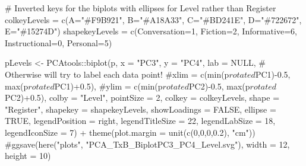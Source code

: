 \documentclass[
  letterpaper,
  DIV=11,
  numbers=noendperiod]{scrreprt}
\newenvironment{Shaded}{\begin{snugshade}}{\end{snugshade}}
\newcommand{\AttributeTok}[1]{\textcolor[rgb]{0.40,0.45,0.13}{#1}}
\newcommand{\CommentTok}[1]{\textcolor[rgb]{0.37,0.37,0.37}{#1}}
\newcommand{\ConstantTok}[1]{\textcolor[rgb]{0.56,0.35,0.01}{#1}}
\newcommand{\DecValTok}[1]{\textcolor[rgb]{0.68,0.00,0.00}{#1}}
\newcommand{\FloatTok}[1]{\textcolor[rgb]{0.68,0.00,0.00}{#1}}
\newcommand{\FunctionTok}[1]{\textcolor[rgb]{0.28,0.35,0.67}{#1}}
\newcommand{\NormalTok}[1]{\textcolor[rgb]{0.00,0.23,0.31}{#1}}
\newcommand{\OtherTok}[1]{\textcolor[rgb]{0.00,0.23,0.31}{#1}}
\newcommand{\SpecialCharTok}[1]{\textcolor[rgb]{0.37,0.37,0.37}{#1}}
\newcommand{\StringTok}[1]{\textcolor[rgb]{0.13,0.47,0.30}{#1}}
\begin{document}
\begin{Shaded}
\begin{Highlighting}[]
\CommentTok{\# Inverted keys for the biplots with ellipses for Level rather than Register}
\NormalTok{colkeyLevels }\OtherTok{=} \FunctionTok{c}\NormalTok{(}\AttributeTok{A=}\StringTok{"\#F9B921"}\NormalTok{, }\AttributeTok{B=}\StringTok{"\#A18A33"}\NormalTok{, }\AttributeTok{C=}\StringTok{"\#BD241E"}\NormalTok{, }\AttributeTok{D=}\StringTok{"\#722672"}\NormalTok{, }\AttributeTok{E=}\StringTok{"\#15274D"}\NormalTok{)}
\NormalTok{shapekeyLevels }\OtherTok{=} \FunctionTok{c}\NormalTok{(}\AttributeTok{Conversation=}\DecValTok{1}\NormalTok{, }\AttributeTok{Fiction=}\DecValTok{2}\NormalTok{, }\AttributeTok{Informative=}\DecValTok{6}\NormalTok{, }\AttributeTok{Instructional=}\DecValTok{0}\NormalTok{, }\AttributeTok{Personal=}\DecValTok{5}\NormalTok{)}

\NormalTok{pLevels }\OtherTok{\textless{}{-}}\NormalTok{ PCAtools}\SpecialCharTok{::}\FunctionTok{biplot}\NormalTok{(p,}
                 \AttributeTok{x =} \StringTok{"PC3"}\NormalTok{,}
                 \AttributeTok{y =} \StringTok{"PC4"}\NormalTok{,}
                 \AttributeTok{lab =} \ConstantTok{NULL}\NormalTok{, }\CommentTok{\# Otherwise will try to label each data point!}
                 \CommentTok{\#xlim = c(min(p$rotated$PC1){-}0.5, max(p$rotated$PC1)+0.5),}
                 \CommentTok{\#ylim = c(min(p$rotated$PC2){-}0.5, max(p$rotated$PC2)+0.5),}
                 \AttributeTok{colby =} \StringTok{"Level"}\NormalTok{,}
                 \AttributeTok{pointSize =} \DecValTok{2}\NormalTok{,}
                 \AttributeTok{colkey =}\NormalTok{ colkeyLevels,}
                 \AttributeTok{shape =} \StringTok{"Register"}\NormalTok{,}
                 \AttributeTok{shapekey =}\NormalTok{ shapekeyLevels,}
                 \AttributeTok{showLoadings =} \ConstantTok{FALSE}\NormalTok{,}
                 \AttributeTok{ellipse =} \ConstantTok{TRUE}\NormalTok{,}
                 \AttributeTok{legendPosition =} \StringTok{\textquotesingle{}right\textquotesingle{}}\NormalTok{,}
                 \AttributeTok{legendTitleSize =} \DecValTok{22}\NormalTok{,}
                 \AttributeTok{legendLabSize =} \DecValTok{18}\NormalTok{, }
                 \AttributeTok{legendIconSize =} \DecValTok{7}\NormalTok{) }\SpecialCharTok{+}
  \FunctionTok{theme}\NormalTok{(}\AttributeTok{plot.margin =} \FunctionTok{unit}\NormalTok{(}\FunctionTok{c}\NormalTok{(}\DecValTok{0}\NormalTok{,}\DecValTok{0}\NormalTok{,}\DecValTok{0}\NormalTok{,}\FloatTok{0.2}\NormalTok{), }\StringTok{"cm"}\NormalTok{))}
\CommentTok{\#ggsave(here("plots", "PCA\_TxB\_BiplotPC3\_PC4\_Level.svg"), width = 12, height = 10)}


\end{Highlighting}
\end{Shaded}
\end{document}
